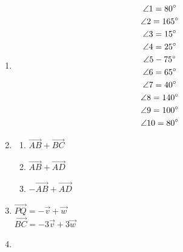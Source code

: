 \documentclass{article}
\begin{document}
\begin{enumerate}
\begin{enumerate}
	\item $x = 51 \degree$ \\
		$y = 112 \degree$
		
	\item $x = 30$ \\
		$y = 10$
		
	\item $x = 6$
	
	\item $x = 50 \degree$
	
	\item $x = -1, 10$
	
	\end{enumerate}
	
\item

	\begin{gather*}
	\angle 1 = 80 \degree \\
	\angle 2 = 165 \degree \\
	\angle 3 = 15 \degree \\
	\angle 4 = 25 \degree \\
	\angle 5 - 75 \degree \\
	\angle 6 = 65 \degree \\
	\angle 7 = 40 \degree \\
	\angle 8 = 140 \degree \\
	\angle 9 = 100 \degree \\
	\angle 10 = 80 \degree
	\end{gather*}
	
\item

	\begin{enumerate}
	
	\item $\overrightarrow{AB} + \overrightarrow{BC}$
	
	\item $\overrightarrow{AB} + \overrightarrow{AD}$
	
	\item $-\overrightarrow{AB} + \overrightarrow{AD}$
	
	\end{enumerate}
	
\item $\overrightarrow{PQ} = -\vec{v} + \vec{w}$ \\
	$\overrightarrow{BC} = -3\vec{v} + 3\vec{w}$
	
\item

	\begin{enumerate}
	

\end{enumerate}
\end{enumerate}
\end{document}
